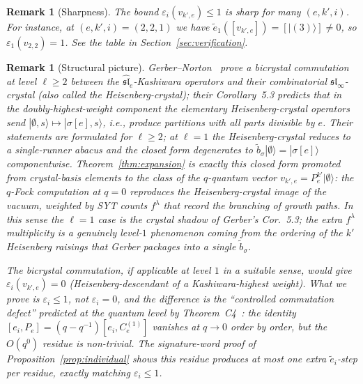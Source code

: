 \documentclass[11pt]{article}
\newtheorem{remark}[theorem]{Remark}
\theoremstyle{definition}
\newcommand{\vke}{v_{k',e}}
\newcommand{\ee}{\tilde e}
\newcommand{\eps}{\varepsilon}
\begin{document}
\begin{remark}[Sharpness]\label{rmk:sharp}
The bound $\eps_i(\vke) \le 1$ is sharp for many $(e, k', i)$. For instance,
at $(e, k', i) = (2, 2, 1)$ we have $\ee_1([\vke]) = [|(3)\rangle] \ne 0$,
so $\eps_1(v_{2,2}) = 1$. See the table in Section~\ref{sec:verification}.
\end{remark}

\begin{remark}[Structural picture]\label{rmk:gerber-shadow}
Gerber--Norton~\cite{GN2017} prove a bicrystal commutation at level
$\ell \ge 2$ between the $\widehat{\mathfrak{sl}}_e$-Kashiwara operators and
their combinatorial $\mathfrak{sl}_\infty$-crystal (also called
the Heisenberg-crystal); their Corollary~5.3 predicts that in the
doubly-highest-weight component the elementary Heisenberg-crystal operators
send $|\emptyset, s\rangle \mapsto |\sigma[e], s\rangle$, i.e., produce
partitions with all parts divisible by $e$.
Their statements are formulated for $\ell \ge 2$; at $\ell = 1$ the
Heisenberg-crystal reduces to a single-runner abacus and the closed form
degenerates to $\tilde b_\sigma |\emptyset\rangle = |\sigma[e]\rangle$
componentwise. Theorem~\ref{thm:expansion} is exactly this closed form
promoted from crystal-basis elements to the class of the
\emph{$q$-quantum} vector $\vke = P_e^{k'}|\emptyset\rangle$: the $q$-Fock
computation at $q = 0$ reproduces the Heisenberg-crystal image of the
vacuum, weighted by SYT counts $f^\lambda$ that record the branching of
growth paths. In this sense the $\ell = 1$ case is the crystal shadow of
Gerber's Cor.~5.3; the extra $f^\lambda$ multiplicity is a genuinely level-$1$
phenomenon coming from the ordering of the $k'$ Heisenberg raisings that
Gerber packages into a single $\tilde b_\sigma$.

The bicrystal commutation, if applicable at level $1$ in a suitable
sense, would give $\eps_i(\vke) = 0$ (Heisenberg-descendant of a
Kashiwara-highest weight). What we prove is $\eps_i \le 1$, not
$\eps_i = 0$, and the difference is the ``controlled commutation
defect'' predicted at the quantum level by
Theorem~C4~\cite{Clio-C4-2026-08-14}: the identity
$[e_i, P_e] = (q - q^{-1})[e_i, C_e^{(1)}]$ vanishes at $q \to 0$ order
by order, but the $O(q^0)$ residue is non-trivial. The signature-word
proof of Proposition~\ref{prop:individual} shows this residue produces
at most one extra $\ee_i$-step per residue, exactly matching
$\eps_i \le 1$.
\end{remark}
\end{document}
